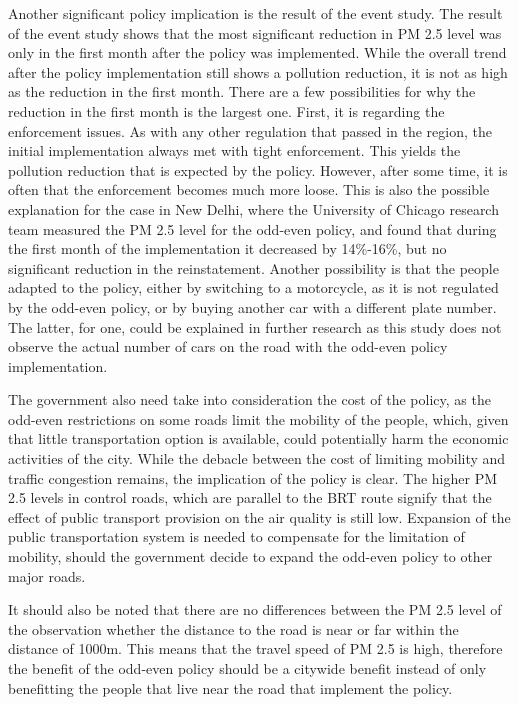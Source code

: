 \documentclass[
]{article}
\begin{document}
Another significant policy implication is the result of the event study.
The result of the event study shows that the most significant reduction
in PM 2.5 level was only in the first month after the policy was
implemented. While the overall trend after the policy implementation
still shows a pollution reduction, it is not as high as the reduction in
the first month. There are a few possibilities for why the reduction in
the first month is the largest one. First, it is regarding the
enforcement issues. As with any other regulation that passed in the
region, the initial implementation always met with tight enforcement.
This yields the pollution reduction that is expected by the policy.
However, after some time, it is often that the enforcement becomes much
more loose. This is also the possible explanation for the case in New
Delhi, where the University of Chicago research team measured the PM 2.5
level for the odd-even policy, and found that during the first month of
the implementation it decreased by 14\%-16\%, but no significant
reduction in the reinstatement. Another possibility is that the people
adapted to the policy, either by switching to a motorcycle, as it is not
regulated by the odd-even policy, or by buying another car with a
different plate number. The latter, for one, could be explained in
further research as this study does not observe the actual number of
cars on the road with the odd-even policy implementation.~

The government also need take into consideration the cost of the policy,
as the odd-even restrictions on some roads limit the mobility of the
people, which, given that little transportation option is available,
could potentially harm the economic activities of the city. While the
debacle between the cost of limiting mobility and traffic congestion
remains, the implication of the policy is clear. The higher PM 2.5
levels in control roads, which are parallel to the BRT route signify
that the effect of public transport provision on the air quality is
still low. Expansion of the public transportation system is needed to
compensate for the limitation of mobility, should the government decide
to expand the odd-even policy to other major roads.~

It should also be noted that there are no differences between the PM 2.5
level of the observation whether the distance to the road is near or far
within the distance of 1000m. This means that the travel speed of PM 2.5
is high, therefore the benefit of the odd-even policy should be a
citywide benefit instead of only benefitting the people that live near
the road that implement the policy.
\end{document}
